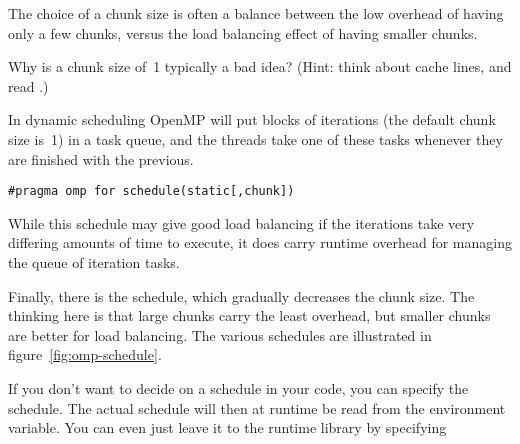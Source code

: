 The choice of a chunk size is often a balance between the low overhead of having 
only a few chunks, versus the load balancing effect of having smaller chunks.
\begin{exercise}
  Why is a chunk size of~1 typically a bad idea? (Hint: think about
  cache lines, and read .)
\end{exercise}

In dynamic scheduling OpenMP will put blocks of iterations
(the default chunk size is~1) in a task queue, and the threads take one of these
tasks whenever they are finished with the previous.
\begin{lstlisting}
#pragma omp for schedule(static[,chunk])
\end{lstlisting}
While this schedule may give good load balancing if the iterations
take very differing amounts of time to execute, it does carry runtime
overhead for managing the queue of iteration tasks.

Finally, there is the  schedule, which gradually decreases the chunk size.
The thinking here is that large chunks carry the least overhead, but smaller chunks are better
for load balancing.
%
The various schedules are illustrated in figure~\ref{fig:omp-schedule}.

If you don't want to decide on a schedule in your code, you can
specify the  schedule. The actual
schedule will then at runtime be read from the
 environment variable. You can even just
leave it to the runtime library by specifying

